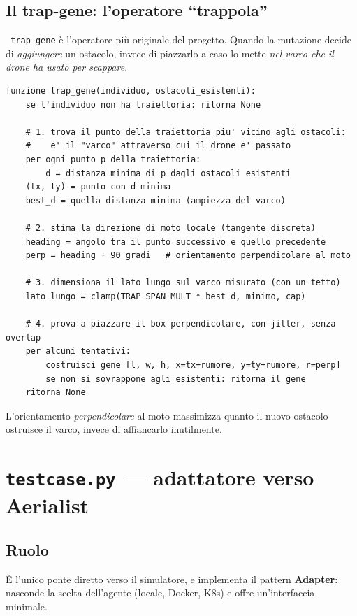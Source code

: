 \documentclass[11pt,a4paper]{report}
\newcommand{\code}[1]{\texttt{#1}}
\begin{document}
\subsection{Il trap-gene: l'operatore ``trappola''}
\code{\_trap\_gene} è l'operatore più originale del progetto. Quando la
mutazione decide di \emph{aggiungere} un ostacolo, invece di piazzarlo a
caso lo mette \emph{nel varco che il drone ha usato per scappare}.
\begin{lstlisting}[style=pseudo]
funzione trap_gene(individuo, ostacoli_esistenti):
    se l'individuo non ha traiettoria: ritorna None

    # 1. trova il punto della traiettoria piu' vicino agli ostacoli:
    #    e' il "varco" attraverso cui il drone e' passato
    per ogni punto p della traiettoria:
        d = distanza minima di p dagli ostacoli esistenti
    (tx, ty) = punto con d minima
    best_d = quella distanza minima (ampiezza del varco)

    # 2. stima la direzione di moto locale (tangente discreta)
    heading = angolo tra il punto successivo e quello precedente
    perp = heading + 90 gradi   # orientamento perpendicolare al moto

    # 3. dimensiona il lato lungo sul varco misurato (con un tetto)
    lato_lungo = clamp(TRAP_SPAN_MULT * best_d, minimo, cap)

    # 4. prova a piazzare il box perpendicolare, con jitter, senza overlap
    per alcuni tentativi:
        costruisci gene [l, w, h, x=tx+rumore, y=ty+rumore, r=perp]
        se non si sovrappone agli esistenti: ritorna il gene
    ritorna None
\end{lstlisting}
L'orientamento \emph{perpendicolare} al moto massimizza quanto il nuovo
ostacolo ostruisce il varco, invece di affiancarlo inutilmente.

\section{\texttt{testcase.py} --- adattatore verso Aerialist}
\label{sec:testcase}

\subsection{Ruolo}
È l'unico ponte diretto verso il simulatore, e implementa il pattern
\textbf{Adapter}: nasconde la scelta dell'agente (locale, Docker, K8s) e
offre un'interfaccia minimale.
\end{document}
